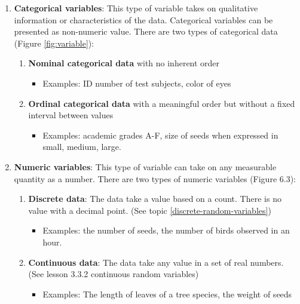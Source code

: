 \documentclass[
]{book}
\providecommand{\tightlist}{%
  \setlength{\itemsep}{0pt}\setlength{\parskip}{0pt}}
\begin{document}
\begin{enumerate}
\def\labelenumi{\alph{enumi})}
\item
  \textbf{Categorical variables}: This type of variable takes on qualitative information or characteristics of the data. Categorical variables can be presented as non-numeric value. There are two types of categorical data (Figure \ref{fig:variable}):

  \begin{enumerate}
  \def\labelenumii{\arabic{enumii}.}
  \tightlist
  \item
    \textbf{Nominal categorical data} with no inherent order

    \begin{itemize}
    \tightlist
    \item
      Examples: ID number of test subjects, color of eyes
    \end{itemize}
  \item
    \textbf{Ordinal categorical data} with a meaningful order but without a fixed interval between values

    \begin{itemize}
    \tightlist
    \item
      Examples: academic grades A-F, size of seeds when expressed in small, medium, large.
    \end{itemize}
  \end{enumerate}
\item
  \textbf{Numeric variables}: This type of variable can take on any measurable quantity as a number. There are two types of numeric variables (Figure 6.3):

  \begin{enumerate}
  \def\labelenumii{\arabic{enumii}.}
  \tightlist
  \item
    \textbf{Discrete data}: The data take a value based on a count. There is no value with a decimal point. (See topic \ref{discrete-random-variables})

    \begin{itemize}
    \tightlist
    \item
      Examples: the number of seeds, the number of birds observed in an hour.
    \end{itemize}
  \item
    \textbf{Continuous data}: The data take any value in a set of real numbers. (See lesson 3.3.2 continuous random variables)

    \begin{itemize}
    \tightlist
    \item
      Examples: The length of leaves of a tree species, the weight of seeds
    \end{itemize}
  \end{enumerate}
\end{enumerate}
\end{document}
